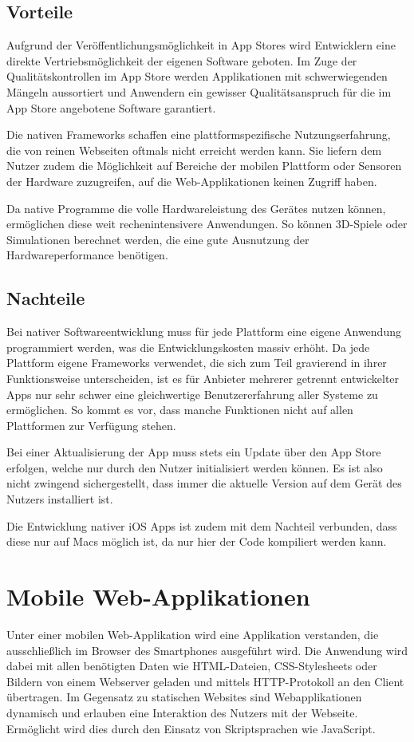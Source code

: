 \subsection{Vorteile}
%
Aufgrund der Veröffentlichungsmöglichkeit in App Stores wird Entwicklern eine direkte Vertriebsmöglichkeit der eigenen Software geboten. Im Zuge der Qualitätskontrollen im App Store werden Applikationen mit schwerwiegenden Mängeln aussortiert und Anwendern ein gewisser Qualitätsanspruch für die im App Store angebotene Software garantiert.

Die nativen Frameworks schaffen eine plattformspezifische Nutzungserfahrung, die von reinen Webseiten oftmals nicht erreicht werden kann. Sie liefern dem Nutzer zudem die Möglichkeit auf Bereiche der mobilen Plattform oder Sensoren der Hardware zuzugreifen, auf die Web-Applikationen keinen Zugriff haben.

Da native Programme die volle Hardwareleistung des Gerätes nutzen können, ermöglichen diese weit rechenintensivere Anwendungen. So können 3D-Spiele oder Simulationen berechnet werden, die eine gute Ausnutzung der Hardwareperformance benötigen.
%
\subsection{Nachteile}
%
Bei nativer Softwareentwicklung muss für jede Plattform eine eigene Anwendung programmiert werden, was die Entwicklungskosten massiv erhöht. Da jede Plattform eigene Frameworks verwendet, die sich zum Teil gravierend in ihrer Funktionsweise unterscheiden, ist es für Anbieter mehrerer getrennt entwickelter Apps nur sehr schwer eine gleichwertige Benutzererfahrung aller Systeme zu ermöglichen. So kommt es vor, dass manche Funktionen nicht auf allen Plattformen zur Verfügung stehen.

Bei einer Aktualisierung der App muss stets ein Update über den App Store erfolgen, welche nur durch den Nutzer initialisiert werden können. Es ist also nicht zwingend sichergestellt, dass immer die aktuelle Version auf dem Gerät des Nutzers installiert ist.

Die Entwicklung nativer iOS Apps ist zudem mit dem Nachteil verbunden, dass diese nur auf Macs möglich ist, da nur hier der Code kompiliert werden kann.
%
%
\section{Mobile Web-Applikationen}
\label{mobileWebApplikationen}
%
Unter einer mobilen Web-Applikation wird eine Applikation verstanden, die ausschließlich im Browser des Smartphones ausgeführt wird. Die Anwendung wird dabei mit allen benötigten Daten wie HTML-Dateien, CSS-Stylesheets oder Bildern von einem Webserver geladen und mittels HTTP-Protokoll an den Client übertragen. Im Gegensatz zu statischen Websites sind Webapplikationen dynamisch und erlauben eine Interaktion des Nutzers mit der Webseite. Ermöglicht wird dies durch den Einsatz von Skriptsprachen wie JavaScript. 


